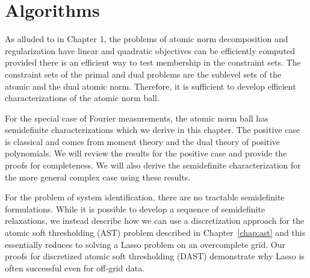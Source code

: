 \chapter{Algorithms}
\label{chap:algos}

As alluded to in Chapter 1, the problems of atomic norm decomposition and
regularization have linear and quadratic objectives can be efficiently computed
provided there is an efficient way to test membership in the constraint sets.
The constraint sets of the primal and dual problems are the sublevel sets of the
atomic and the dual atomic norm. Therefore, it is sufficient to develop
efficient characterizations of the atomic norm ball.

For the special case of Fourier measurements, the atomic norm ball has
semidefinite characterizations which we derive in this chapter. The positive
case is classical and comes from moment theory and the dual theory of positive
polynomials. We will review the results for the positive case and provide the
proofs for completeness. We will also derive the semidefinite characterization
for the more general complex case using these results.

For the problem of system identification, there are no tractable semidefinite
formulations. While it is possible to develop a sequence of semidefinite
relaxations, we instead describe how we can use a discretization approach for
the atomic soft thresholding (AST) problem described in Chapter~\ref{chap:ast}
and this essentially reduces to solving a Lasso problem on an overcomplete grid.
Our proofs for discretized atomic soft thresholding (DAST) demonstrate why Lasso
is often successful even for off-grid data.


